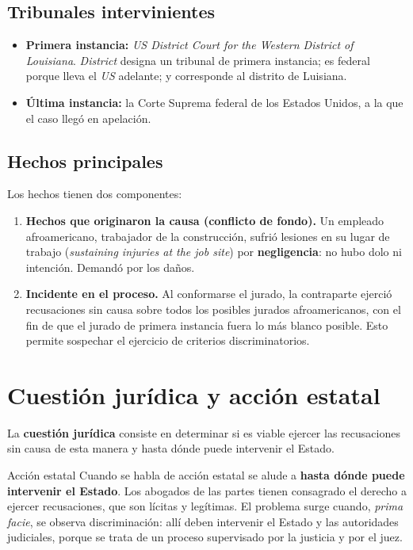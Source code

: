 \documentclass[12pt,oneside]{book}
\begin{document}
\subsection{Tribunales intervinientes}

\begin{itemize}
    \item \textbf{Primera instancia:} \textit{US District Court for the Western District of Louisiana}. \textit{District} designa un tribunal de primera instancia; es federal porque lleva el \textit{US} adelante; y corresponde al distrito de Luisiana.
    \item \textbf{Última instancia:} la Corte Suprema federal de los Estados Unidos, a la que el caso llegó en apelación.
\end{itemize}

\subsection{Hechos principales}

Los hechos tienen dos componentes:

\begin{enumerate}
    \item \textbf{Hechos que originaron la causa (conflicto de fondo).} Un empleado afroamericano, trabajador de la construcción, sufrió lesiones en su lugar de trabajo (\textit{sustaining injuries at the job site}) por \textbf{negligencia}: no hubo dolo ni intención. Demandó por los daños.
    \item \textbf{Incidente en el proceso.} Al conformarse el jurado, la contraparte ejerció recusaciones sin causa sobre todos los posibles jurados afroamericanos, con el fin de que el jurado de primera instancia fuera lo más blanco posible. Esto permite sospechar el ejercicio de criterios discriminatorios.
\end{enumerate}

\section{Cuestión jurídica y acción estatal}

La \textbf{cuestión jurídica} consiste en determinar si es viable ejercer las recusaciones sin causa de esta manera y hasta dónde puede intervenir el Estado.

\begin{definition}{Acción estatal}
Cuando se habla de acción estatal se alude a \textbf{hasta dónde puede intervenir el Estado}. Los abogados de las partes tienen consagrado el derecho a ejercer recusaciones, que son lícitas y legítimas. El problema surge cuando, \textit{prima facie}, se observa discriminación: allí deben intervenir el Estado y las autoridades judiciales, porque se trata de un proceso supervisado por la justicia y por el juez.
\end{definition}
\end{document}
